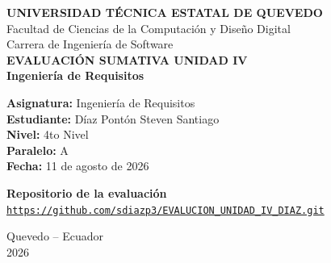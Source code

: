\documentclass[12pt,a4paper]{article}
\begin{document}

\begin{titlepage}
\centering

{\Large\textbf{UNIVERSIDAD TÉCNICA ESTATAL DE QUEVEDO}}\\[0.35cm]

{\large Facultad de Ciencias de la Computación y Diseño Digital}\\[0.15cm]

{\large Carrera de Ingeniería de Software}\\[1.2cm]

{\LARGE\textbf{EVALUACIÓN SUMATIVA UNIDAD IV}}\\[0.35cm]

{\large\textbf{Ingeniería de Requisitos}}\\[1.1cm]

\begin{flushleft}

\textbf{Asignatura:} Ingeniería de Requisitos\\[0.35cm]

\textbf{Estudiante:} Díaz Pontón Steven Santiago\\[0.35cm]

\textbf{Nivel:} 4to Nivel\\[0.35cm]

\textbf{Paralelo:} A\\[0.35cm]

\textbf{Fecha:} 11 de agosto de 2026

\end{flushleft}

\vspace{0.8cm}

\textbf{Repositorio de la evaluación}\\[0.3cm]

\href{https://github.com/sdiazp3/EVALUCION_UNIDAD_IV_DIAZ.git}
{\small\texttt{https://github.com/sdiazp3/EVALUCION\_UNIDAD\_IV\_DIAZ.git}}

\vfill

{\large Quevedo -- Ecuador}\\
{\large 2026}

\end{titlepage}

\end{document}

